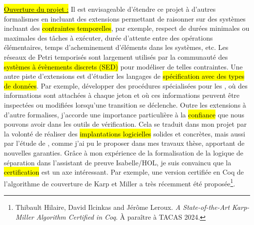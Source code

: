 \hl{\underline{Ouverture du projet :}} Il est envisageable d'étendre ce projet à
d'autres formalismes en incluant des extensions permettant de raisonner sur des
systèmes incluant des \hl{contraintes temporelles}, par exemple, respect de
durées minimales ou maximales des tâches à exécuter, durée d'attente entre des
opérations élémentaires, temps d'acheminement d'éléments dans les systèmes, etc.
Les réseaux de Petri temporisés sont largement utilisés par la communauté des
\hl{systèmes à évènements discrets (SED)} pour modéliser de telles contraintes.
Une autre piste d'extensions est d'étudier les langages de \hl{spécification
avec des types de données}. Par exemple, développer des procédures spécialisées
pour les , où des informations sont attachées à
chaque jeton et où ces informations peuvent être inspectées ou modifiées
lorsqu'une transition se déclenche. Outre les extensions à d'autre formalises,
j'accorde une importance particulière à la \hl{confiance} que nous pouvons avoir
dans les outils de vérification. Cela se traduit dans mon projet par la volonté
de réaliser des \hl{implantations logicielles} solides et concrètes, mais aussi
par l'étude de , comme j'ai pu le proposer dans
mes travaux thèse, apportant de nouvelles garanties. Grâce à mon expérience de
la formalisation de la logique de séparation dans l'assistant de preuve
Isabelle/HOL, je suis convaincu que la \hl{certification} est un axe
intéressant. Par exemple, une version certifiée en Coq de l'algorithme de
couverture de Karp et Miller a très récemment été proposée\footnote{ Thibault
Hilaire, David Ilcinkas and Jérôme Leroux. \textit{A State-of-the-Art
Karp-Miller Algorithm Certified in Coq}. À paraître à TACAS 2024.}. 









